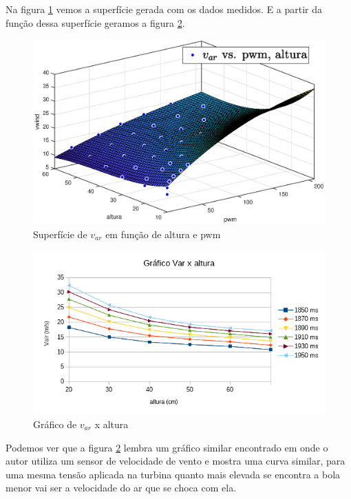 Na figura \ref{fig:curvavar} vemos a superfície gerada com os dados medidos. E a partir da função dessa superfície geramos a figura \ref{fig:graficovairaltura1}.

\begin{figure}[htb]
	\centering
	\includegraphics[width=1\linewidth]{pasta1_figuras/curvavar}
	\caption[Superfície de $v_{ar}$ em função de altura e pwm]{Superfície de $v_{ar}$ em função de altura e pwm}
	\label{fig:curvavar}
\end{figure}


\begin{figure}[htb]
	\centering
	\includegraphics[width=1\linewidth]{grafico_vair_altura}
	\caption[Gráfico $v_{ar}$ x altura]{Gráfico de $v_{ar}$ x altura}
	\label{fig:graficovairaltura1}
\end{figure}

Podemos ver que a figura \ref{fig:graficovairaltura1} lembra um gráfico similar encontrado em \cite{jernigan2009} onde o autor utiliza um sensor de velocidade de vento e mostra uma curva similar, para uma mesma tensão aplicada na turbina quanto mais elevada se encontra a bola menor vai ser a velocidade do ar que se choca com ela.

